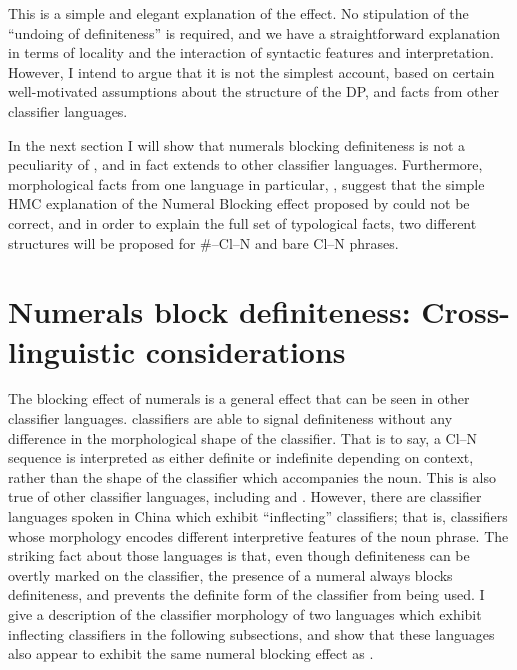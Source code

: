 \documentclass[output=paper
,modfonts
,nonflat]{langsci/langscibook}
\begin{document}
This is a simple and elegant explanation of the  effect. No stipulation of the ``undoing of definiteness'' is required, and we have a straightforward explanation in terms of locality and the interaction of syntactic features and interpretation. However, I intend to argue that it is not the simplest account, based on certain well-motivated assumptions about the structure of the DP, and facts from other classifier languages. 

In the next section I will show that numerals blocking definiteness is not a peculiarity of , and in fact extends to other classifier languages. Furthermore, morphological facts from one language in particular, , suggest that the simple HMC explanation of the Numeral Blocking effect proposed by \citeauthor{Simpson2005} could not be correct, and in order to explain the full set of typological facts, two different structures will be proposed for \#--Cl--N and bare Cl--N phrases.

\section{Numerals block definiteness: Cross-linguistic considerations}

The blocking effect of numerals is a general effect that can be seen in other classifier languages.  classifiers are able to signal definiteness without any difference in the morphological shape of the classifier. That is to say, a Cl--N sequence is interpreted as either definite or indefinite depending on context, rather than the shape of the classifier which accompanies the noun. This is also true of other classifier languages, including  and . However, there are classifier languages spoken in China which exhibit ``inflecting'' classifiers; that is, classifiers whose morphology encodes different interpretive features of the noun phrase. The striking fact about those languages is that, even though definiteness can be overtly marked on the classifier, the presence of a numeral always blocks definiteness, and prevents the definite form of the classifier from being used. I give a description of the classifier morphology of two languages which exhibit inflecting classifiers in the following subsections, and show that these languages also appear to exhibit the same numeral blocking effect as .
\end{document}
